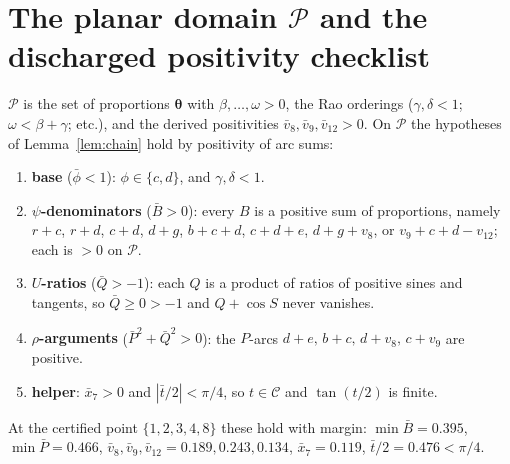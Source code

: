 \documentclass[pdflatex,sn-mathphys-num]{sn-jnl}
\theoremstyle{thmstyleone}%
\theoremstyle{thmstyletwo}%
\theoremstyle{thmstylethree}%
\begin{document}
\section{The planar domain \texorpdfstring{$\mathcal P$}{P} and the discharged positivity checklist}
$\mathcal P$ is the set of proportions $\boldsymbol\theta$ with $\beta,\dots,\omega>0$, the Rao orderings ($\gamma,\delta<1$; $\omega<\beta+\gamma$; etc.), and the derived positivities $\bar v_8,\bar v_9,\bar v_{12}>0$. On $\mathcal P$ the hypotheses of Lemma~\ref{lem:chain} hold by positivity of arc sums:
\begin{enumerate}\itemsep1pt
\item \textbf{base} ($\bar\phi<1$): $\phi\in\{c,d\}$, and $\gamma,\delta<1$.
\item \textbf{$\psi$-denominators} ($\bar B>0$): every $B$ is a positive sum of
proportions, namely $r{+}c$, $r{+}d$, $c{+}d$, $d{+}g$, $b{+}c{+}d$,
$c{+}d{+}e$, $d{+}g{+}v_8$, or $v_9{+}c{+}d{-}v_{12}$; each is $>0$ on $\mathcal P$.
\item \textbf{$U$-ratios} ($\bar Q>-1$): each $Q$ is a product of ratios of positive sines and tangents, so $\bar Q\ge0>-1$ and $Q+\cos S$ never vanishes.
\item \textbf{$\rho$-arguments} ($\bar P^2+\bar Q^2>0$): the $P$-arcs
$d{+}e,\,b{+}c,\,d{+}v_8,\,c{+}v_9$ are positive. \item \textbf{helper}: $\bar x_7>0$ and $|\bar t/2|<\pi/4$, so $t\in\mathcal C$ and $\tan(t/2)$ is finite.
\end{enumerate}
At the certified point $\{1,2,3,4,8\}$ these hold with margin: $\min\bar B=0.395$, $\min\bar P=0.466$, $\bar v_8,\bar v_9,\bar v_{12}=0.189,0.243,0.134$, $\bar x_7=0.119$, $\bar t/2=0.476<\pi/4$.
\end{document}
